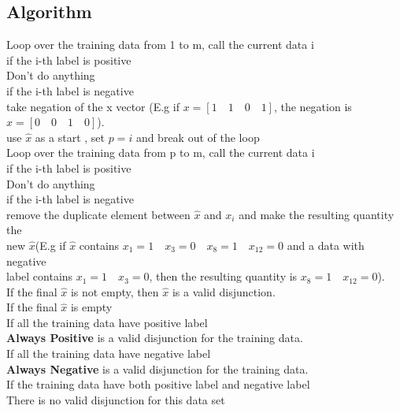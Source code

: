\subsection{Algorithm}
Loop over the training data from 1 to m, call the current data i
\\ \indent if the i-th label is positive
\\ \indent \indent Don't do anything
\\ \indent if the i-th label is negative
\\ \indent \indent take negation of the x vector (E.g if $x=[1\quad1\quad0\quad1]$, the negation is $\hat{x}=[0\quad0\quad1\quad0]$). 
\\ \indent \indent use $\hat{x}$ as a start , set $p=i$ and break out of the loop
\\Loop over the training data from p to m, call the current data i
\\ \indent if the i-th label is positive
\\ \indent \indent Don't do anything
\\ \indent if the i-th label is negative
\\ \indent \indent remove the duplicate element between $\hat{x}$ and $x_i$ and make the resulting quantity the 
\\ \indent \indent new $\hat{x}$(E.g if $\hat{x}$ contains $x_1=1\quad x_3=0\quad x_8=1 \quad x_{12}=0$ and a data with negative \\ \indent \indent label contains $x_1=1 \quad x_3=0$, then the resulting quantity is $x_8=1 \quad x_{12}=0$). 
\\ If the final $\hat{x}$ is not empty, then $\hat{x}$ is a valid disjunction.
\\ If the final $\hat{x}$ is empty
\\ \indent If all the training data have positive label
\\ \indent \indent \textbf{Always Positive} is a valid disjunction for the training data.
\\ \indent If all the training data have negative label 
\\ \indent \indent \textbf{Always Negative} is a valid disjunction for the training data.
\\ \indent If the training data have both positive label and negative label 
\\ \indent \indent There is no valid disjunction for this data set

